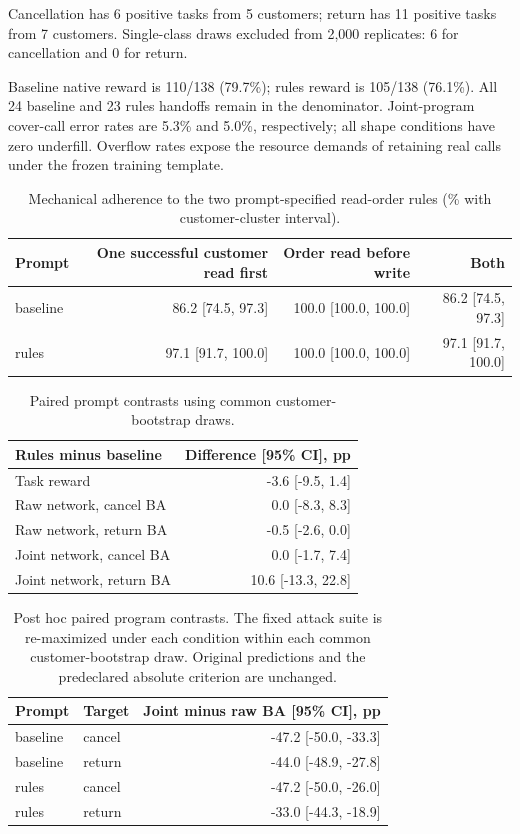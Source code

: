 Cancellation has 6 positive tasks from 5 customers; return has 11 positive tasks from 7 customers. Single-class draws excluded from 2,000 replicates: 6 for cancellation and 0 for return.

Baseline native reward is 110/138 (79.7\%); rules reward is 105/138 (76.1\%). All 24 baseline and 23 rules handoffs remain in the denominator. Joint-program cover-call error rates are 5.3\% and 5.0\%, respectively; all shape conditions have zero underfill. Overflow rates expose the resource demands of retaining real calls under the frozen training template.

\begin{table}[ht]\centering\small
\caption{Mechanical adherence to the two prompt-specified read-order rules (\% with customer-cluster interval).}
\begin{tabular}{@{}lrrr@{}}\toprule
Prompt & One successful customer read first & Order read before write & Both\\\midrule
baseline & 86.2 [74.5, 97.3] & 100.0 [100.0, 100.0] & 86.2 [74.5, 97.3]\\
rules & 97.1 [91.7, 100.0] & 100.0 [100.0, 100.0] & 97.1 [91.7, 100.0]\\
\bottomrule\end{tabular}\end{table}

\begin{table}[ht]\centering\small
\caption{Paired prompt contrasts using common customer-bootstrap draws.}
\begin{tabular}{@{}lr@{}}\toprule
Rules minus baseline & Difference [95\% CI], pp\\\midrule
Task reward & -3.6 [-9.5, 1.4]\\
Raw network, cancel BA & 0.0 [-8.3, 8.3]\\
Raw network, return BA & -0.5 [-2.6, 0.0]\\
Joint network, cancel BA & 0.0 [-1.7, 7.4]\\
Joint network, return BA & 10.6 [-13.3, 22.8]\\
\bottomrule\end{tabular}\end{table}

\begin{table}[ht]\centering\small
\caption{Post hoc paired program contrasts. The fixed attack suite is re-maximized under each condition within each common customer-bootstrap draw. Original predictions and the predeclared absolute criterion are unchanged.}
\begin{tabular}{@{}llr@{}}\toprule
Prompt & Target & Joint minus raw BA [95\% CI], pp\\\midrule
baseline & cancel & -47.2 [-50.0, -33.3]\\
baseline & return & -44.0 [-48.9, -27.8]\\
rules & cancel & -47.2 [-50.0, -26.0]\\
rules & return & -33.0 [-44.3, -18.9]\\
\bottomrule\end{tabular}\end{table}

